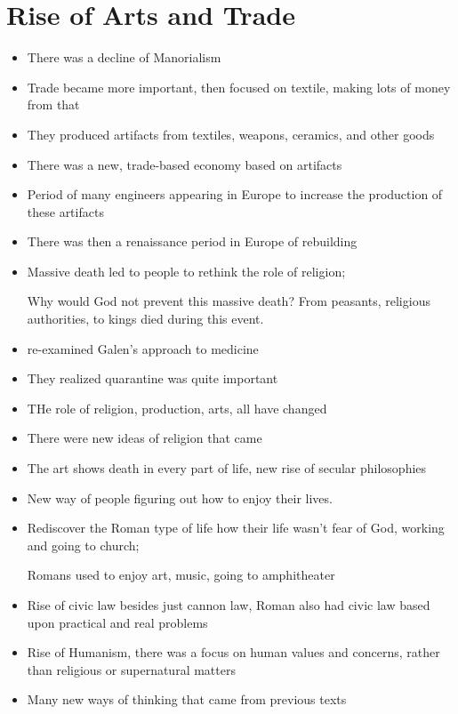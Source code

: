 \documentclass{article}
\begin{document}
\section*{Rise of Arts and Trade}
\begin{itemize}
  \item There was a decline of Manorialism
  \item Trade became more important, then focused on textile, making lots
    of money from that
  \item They produced artifacts from textiles, weapons, ceramics, and other goods
  \item There was a new, trade-based economy based on artifacts
  \item Period of many engineers appearing in Europe to increase
    the production of these artifacts
  \item There was then a renaissance period in Europe of rebuilding
  \item Massive death led to people to rethink the role of religion;

    Why would God not prevent this massive death?
    From peasants, religious authorities, to kings died during this event.
  \item re-examined Galen's approach to medicine
  \item They realized quarantine was quite important
  \item THe role of religion, production, arts, all have changed
  \item There were new ideas of religion that came
  \item The art shows death in every part of life, new rise of secular philosophies
  \item New way of people figuring out how to enjoy their lives.
  \item Rediscover the Roman type of life how their life wasn't fear of God, working
    and going to church;

    Romans used to enjoy art, music, going to amphitheater
  \item Rise of civic law besides just cannon law, Roman also had civic law
    based upon practical and real problems
  \item Rise of Humanism, there was a focus on human values and concerns,
    rather than religious or supernatural matters
  \item Many new ways of thinking that came from previous texts
\end{itemize}
\end{document}
